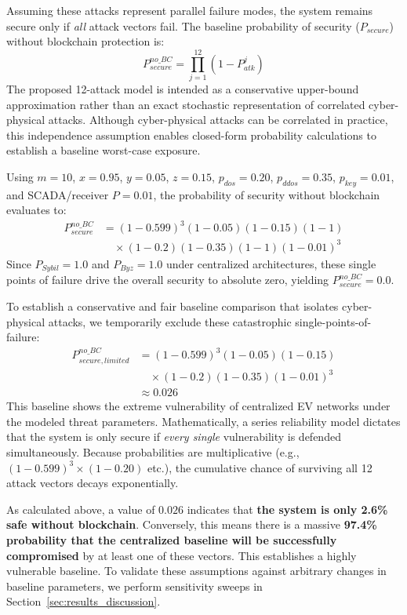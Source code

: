 \documentclass[10pt,twocolumn,journal]{IEEEtran}
\begin{document}
Assuming these attacks represent parallel failure modes, the system remains secure only if \emph{all} attack vectors fail. The baseline probability of security ($P_{secure}$) without blockchain protection is:
\begin{equation}
P_{secure}^{no\_BC} = \prod_{j=1}^{12} (1 - P_{atk}^j)
\end{equation}
The proposed 12-attack model is intended as a conservative upper-bound approximation rather than an exact stochastic representation of correlated cyber-physical attacks. Although cyber-physical attacks can be correlated in practice, this independence assumption enables closed-form probability calculations to establish a baseline worst-case exposure.

Using $m=10$, $x=0.95$, $y=0.05$, $z=0.15$, $p_{dos}=0.20$, $p_{ddos}=0.35$, $p_{key}=0.01$, and SCADA/receiver $P=0.01$, the probability of security without blockchain evaluates to:
\begin{equation}
\begin{split}
P_{secure}^{no\_BC} &= (1-0.599)^3(1-0.05)(1-0.15)(1-1)\\
&\quad \times (1-0.2)(1-0.35)(1-1)(1-0.01)^3
\end{split}
\end{equation}
Since $P_{Sybil} = 1.0$ and $P_{Byz} = 1.0$ under centralized architectures, these single points of failure drive the overall security to absolute zero, yielding $P_{secure}^{no\_BC} = 0.0$.

To establish a conservative and fair baseline comparison that isolates cyber-physical attacks, we temporarily exclude these catastrophic single-points-of-failure:
\begin{equation}
\begin{split}
P_{secure, limited}^{no\_BC} &= (1-0.599)^3(1-0.05)(1-0.15)\\
&\quad \times (1-0.2)(1-0.35)(1-0.01)^3 \\
&\approx 0.026
\end{split}
\end{equation}
This baseline shows the extreme vulnerability of centralized EV networks under the modeled threat parameters. Mathematically, a series reliability model dictates that the system is only secure if \emph{every single} vulnerability is defended simultaneously. Because probabilities are multiplicative (e.g., $(1 - 0.599)^3 \times (1 - 0.20)$ etc.), the cumulative chance of surviving all 12 attack vectors decays exponentially. 

As calculated above, a value of $0.026$ indicates that \textbf{the system is only 2.6\% safe without blockchain}. Conversely, this means there is a massive \textbf{97.4\% probability that the centralized baseline will be successfully compromised} by at least one of these vectors. This establishes a highly vulnerable baseline. To validate these assumptions against arbitrary changes in baseline parameters, we perform sensitivity sweeps in Section~\ref{sec:results_discussion}.
\end{document}

